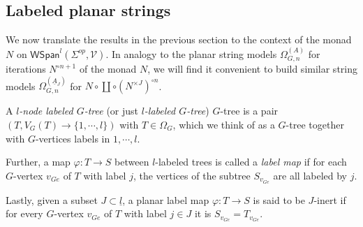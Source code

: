 \documentclass[a4paper,10pt]{article}%
\begin{document}
\subsection{Labeled planar strings}

We now translate the results in the previous section to the context of the monad $N$ on $\mathsf{WSpan}^l(\Sigma^{op},\mathcal{V})$. In analogy to the planar string models $\Omega_{G,n}^{(A)}$ for iterations $N^{\circ n+1}$ of the monad $N$,
we will find it convenient to build similar string models
$\Omega_{G,n}^{(\underline{A}_J)}$ for 
$N \circ \coprod \circ (N^{\times J})^{\circ n}$.


\begin{definition}
A \textit{$l$-node labeled $G$-tree} (or just \textit{$l$-labeled $G$-tree}) $G$-tree is a pair $(T,V_G(T) \to \{1,\cdots,l\})$ with $T \in \Omega_G$, which we think of as a $G$-tree together with $G$-vertices labels in $1,\cdots,l$.

Further, a map $\varphi \colon T \to S$ between $l$-labeled trees is called a \textit{label map} if for each $G$-vertex $v_{G e}$ of $T$ with label $j$, the vertices of the subtree $S_{v_{G e}}$ are all labeled by $j$.

Lastly, given a subset $J\subset \underline{l}$, a planar label map $\varphi \colon T \to S$ is said to be $J$-inert if for every $G$-vertex $v_{G e}$ of $T$ with label $j \in J$ it is $S_{v_{Ge}} = T_{v_{Ge}}$.
\end{definition}
\end{document}
